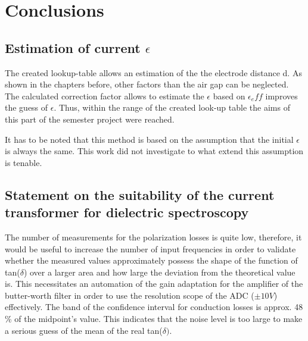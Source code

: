 \chapter{Conclusions}
\section{Estimation of current $\epsilon$}
The created lookup-table allows an estimation of the the electrode distance d.  As shown in the chapters before, other factors than the air gap can be neglected. The calculated correction factor allows to estimate the $\epsilon$ based on $\epsilon_eff$ improves the guess of $\epsilon$. Thus, within the range of the created look-up table the aims of this part of the semester project were reached. 

It has to be noted that this method is based on the assumption that the initial $\epsilon$ is always the same. This work did not investigate to what extend this assumption is tenable. 

\section{Statement on the suitability of the current transformer for dielectric spectroscopy}

The number of measurements for the polarization losses is quite low, therefore, it would be useful to increase the number of input frequencies in order to validate whether the measured values approximately possess the shape of the function of tan($\delta$) over a larger area and how large the deviation from the theoretical value is. This necessitates an automation of the gain adaptation for the amplifier of the butter-worth filter in order to use the resolution scope of the ADC ($\pm 10V$)  effectively. 
The band of the confidence interval for conduction losses is approx. 48 \% of the midpoint's value. This indicates that the noise level is too large to make a serious guess of the mean of the real tan($\delta)$.





